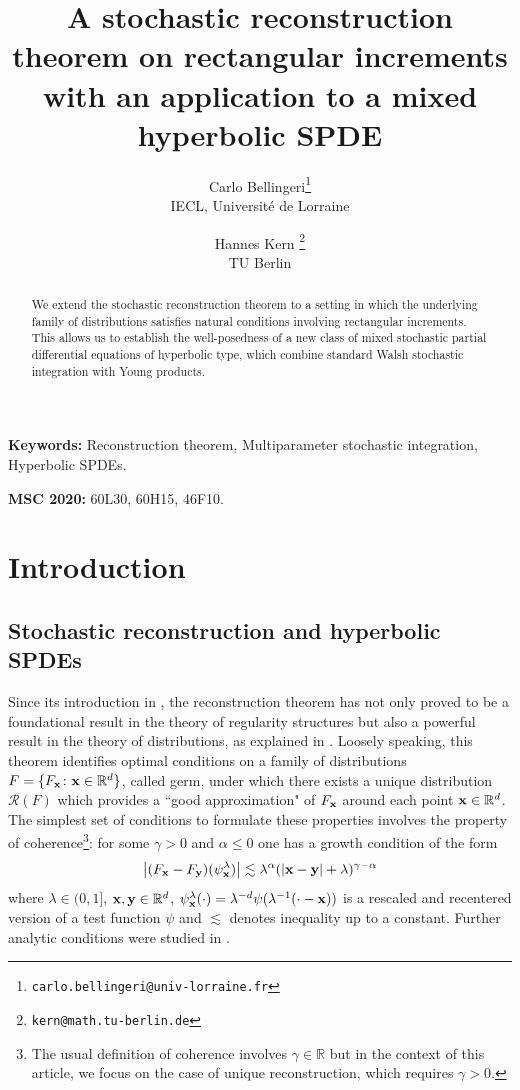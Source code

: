 \documentclass[12pt]{article}
\title{A stochastic reconstruction theorem on rectangular increments with an application to a mixed hyperbolic SPDE}
\author{
   Carlo Bellingeri\thanks{ \texttt{carlo.bellingeri@univ-lorraine.fr}}\\
  IECL, Université de Lorraine
  \and
 Hannes Kern \thanks{\texttt{kern@math.tu-berlin.de}}\\
 TU Berlin
}
\date{}
\numberwithin{equation}{section}
\theoremstyle{plain}
\theoremstyle{definition}
\newcommand{\abs}[1]{\left\vert #1 \right\vert}
\def\fy{\mathbf y}\def\fz{\mathbf z}
\begin{document}
\maketitle
\begin{abstract}
We extend the stochastic reconstruction theorem to a setting in which the underlying family of distributions satisfies natural conditions involving rectangular increments. This allows us to establish the well-posedness of a new class of mixed stochastic partial differential equations of hyperbolic type, which combine standard Walsh stochastic integration with Young products.
	\end{abstract}
 \medskip
 
 \textbf{Keywords:} Reconstruction theorem, Multiparameter stochastic integration, Hyperbolic SPDEs.

\medskip

  \textbf{MSC 2020:} 60L30, 60H15, 46F10.
\tableofcontents

\section{Introduction}
\subsection{Stochastic reconstruction and hyperbolic SPDEs}
Since its introduction in \cite{Hairer2014}, the reconstruction theorem has not only proved to be a foundational result in the theory of regularity structures but also a powerful result in the theory of distributions, as explained in \cite{zambotti2020}.  Loosely speaking,  this theorem  identifies optimal conditions on a  family of distributions $F=\{ F_\mathbf x\colon \mathbf x\in \mathbb{R}^d\}$, called germ, under which there exists a unique distribution  $\mathcal{R}(F)$ which provides a   ``good approximation" of  $F_\mathbf x$ around each point $\mathbf x\in \mathbb{R}^d$. The simplest set of conditions to formulate these properties involves the property of coherence\footnote{The usual definition of coherence involves $\gamma\in \mathbb R$ but in the context of this article, we focus on the case of unique reconstruction, which requires $\gamma>0$. }:  for some $\gamma>0$ and $\alpha\leq 0$ one has a growth condition of the form
\begin{equation}\label{ineq:coherenceIntro}
    \abs{(F_\fx- F_\fy)(\psi_\fx^\lambda)} \lesssim \lambda^{\alpha}(|\fx- \fy|+ \lambda)^{\gamma- \alpha}
\end{equation}
where $\lambda\in (0,1]$, $\fx, \fy\in \mathbb R^d$, 
 $\psi_\mathbf x^\lambda(\cdot)=\lambda^{-d}\psi(\lambda^{-1}(\cdot- \mathbf x))$ is a rescaled and recentered version of a test function $\psi$ and $\lesssim$ denotes inequality up to a constant. Further analytic conditions were studied in \cite{Broux2023,ZorinKranich2022}.
\end{document}
